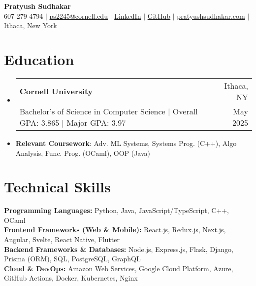 \documentclass[letterpaper,11pt]{article}
\makeatletter
\newcommand{\resumeItem}[1]{
  \item\small{
    {#1 \vspace{-1pt}}
  }
}
\newcommand{\education}[4]{
  \vspace{-2pt}\item
    \begin{tabular*}{0.97\textwidth}[t]{@{}l@{\extracolsep{\fill}}r@{}}
      \textbf{#1} & #2 \\
      \small#3 & \small #4 \\
    \end{tabular*}\vspace{-6pt}
}
\newcommand{\resumeSubHeadingListStart}{\begin{itemize}[leftmargin=0.15in, label={}]}
\newcommand{\resumeSubHeadingListEnd}{\end{itemize}}
\makeatother
\begin{document}

\begin{center}
  \vspace*{-1cm}
  \textbf{\huge  Pratyush Sudhakar} \\ \vspace{1pt}
   607-279-4794 $|$ \href{mailto:ps2245@cornell.edu}{ps2245@cornell.edu} $|$
  \href{https://linkedin.com/in/pratyushsudhakar}{LinkedIn} $|$
  \href{https://github.com/pratyush1712}{GitHub} $|$
  \href{https://pratyushsudhakar.com/}{pratyushsudhakar.com}
  $|$
  {Ithaca, New York}
\end{center}


\vspace{-6.414pt}
\section{Education}
\resumeSubHeadingListStart
\education
{Cornell University}{Ithaca, NY}
{Bachelor's of Science in Computer Science $|$ Overall GPA: 3.865 $|$ Major GPA: 3.97}{May 2025}
\resumeItem{\textbf{Relevant Coursework}: Adv. ML Systems, Systems Prog. (C++), Algo Analysis, Func. Prog. (OCaml), OOP (Java)}
\vspace{-14.7pt}
\resumeSubHeadingListEnd

\vspace{-9.5pt}
\section{Technical Skills}
\begin{itemize}[leftmargin=0.15in, label={}]
\small{\item{
    \textbf{Programming Languages:} Python, Java, JavaScript/TypeScript, C++, OCaml \\
    \vspace{2pt}
    \textbf{Frontend Frameworks (Web \& Mobile):} React.js, Redux.js, Next.js, Angular, Svelte, React Native, Flutter \\
    \vspace{2pt}
    \textbf{Backend Frameworks \& Databases:} Node.js, Express.js, Flask, Django, Prisma (ORM), SQL, PostgreSQL, GraphQL \\
    \vspace{2pt}
    \textbf{Cloud \& DevOps:} Amazon Web Services, Google Cloud Platform, Azure, GitHub Actions, Docker, Kubernetes, Nginx
}}
\end{itemize}
\end{document}
